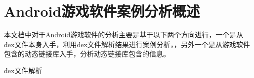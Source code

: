 \section{Android游戏软件案例分析概述}
本文档中对于Android游戏软件的分析主要是基于以下两个方向进行，一个是从dex文件本身入手，利用dex文件解析结果进行案例分析，，另外一个是从游戏软件包含的动态链接库入手，分析动态链接库包含的信息。

dex文件解析
